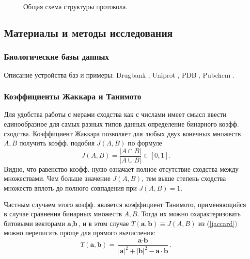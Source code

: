 \documentclass[a4paper,14pt]{article}         %
\begin{document}
\begin{figure}
	\begin{minipage}[!ht]{1\linewidth}
		\caption{Общая схема структуры протокола.}
		\label{structure}
	\end{minipage}
\end{figure}

\newpage
\subsection{Материалы и методы исследования}
\subsubsection{Биологические базы данных}
\color{orange} Описание устройства баз и примеры: Drugbank \cite{drugbank}, Uniprot \cite{uniprot} , PDB \cite{pdb}, Pubchem \cite{pubchem}. \color{black}
\subsubsection{Коэффициенты Жаккара и Танимото}
Для удобства работы с мерами сходства как с числами имеет смысл ввести единообразное для самых разных типов данных определение бинарного коэфф. сходства. Коэффициент Жаккара \cite{Jaccard1901} позволяет для любых двух конечных множеств $A, B$ получить коэфф. подобия $J(A, B)$ по формуле
\begin{equation}
\label{jaccard}
J(A, B) = \frac{|A\cap B|}{|A\cup B|} \in [0, 1].
\end{equation}
Видно, что равенство коэфф. нулю означает полное отсутствие сходства между множествами. Чем больше значение $J(A, B)$, тем выше степень сходства множеств вплоть до полного совпадения при $J(A, B) = 1$.

Частным случаем этого коэфф. является коэффициент Танимото, применяющийся в случае сравнения бинарных множеств $A, B$. Тогда их можно охарактеризовать битовыми векторами $\textbf{a}, \textbf{b}$, и в этом случае \linebreak $T(\textbf{a}, \textbf{b}) \equiv J(A, B) $ из (\ref{jaccard}) можно переписать проще для прямого вычисления:
\begin{equation}
T(\textbf{a}, \textbf{b}) = \frac{\textbf{a}\cdot\textbf{b}}{|\textbf{a}|^2 + |\textbf{b}|^2 - \textbf{a}\cdot\textbf{b}}.
\end{equation}
\end{document}
